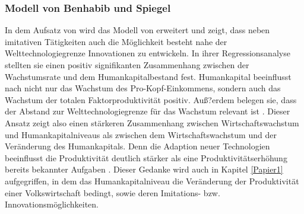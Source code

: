 \subsubsection*{Modell von Benhabib und Spiegel}
In dem Aufsatz von \cite{Benhabib.1994} wird das Modell von \cite{Nelson.1966} erweitert und zeigt, dass neben imitativen Tätigkeiten auch die Möglichkeit besteht nahe der Welttechnologiegrenze Innovationen zu entwickeln. In ihrer Regressionsanalyse stellten sie einen positiv signifikanten Zusammenhang zwischen der Wachstumsrate und dem Humankapitalbestand fest. Humankapital beeinflusst nach \cite{Benhabib.1994} nicht nur das Wachstum des Pro-Kopf-Einkommens, sondern auch das Wachstum der totalen Faktorproduktivität positiv.  Auß?erdem belegen sie, dass der Abstand zur Welttechnologiegrenze für das Wachstum relevant ist \cite{Benhabib.1994}. Dieser Ansatz zeigt also einen stärkeren Zusammenhang zwischen Wirtschaftswachstum und Humankapitalniveaus als zwischen dem Wirtschaftswachstum und der Veränderung des Humankapitals. Denn die Adaption neuer Technologien beeinflusst die Produktivität deutlich stärker als eine Produktivitätserhöhung bereits bekannter Aufgaben \cite{Benhabib.1994}. Dieser Gedanke wird auch in Kapitel \ref{Papier1} aufgegriffen, in dem das Humankapitalniveau die Veränderung der Produktivität einer Volkswirtschaft bedingt, sowie deren Imitations- bzw. Innovationsmöglichkeiten. 
%
